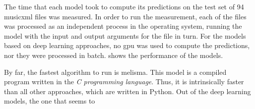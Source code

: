 
The time that each model took to compute its predictions on
the test set of 94 \gls{musicxml} files was measured. In
order to run the measurement, each of the files was
processed as an independent process in the operating system,
running the model with the input and output arguments for
the file in turn. For the models based on deep learning
approaches, no \gls{gpu} was used to compute the
predictions, nor they were processed in batch.
 shows the performance of the
models.


By far, the fastest algorithm to run is \gls{melisma}. This
model is a compiled program written in the \emph{C
programming language}. Thus, it is intrinsically faster than
all other approaches, which are written in Python. Out of
the deep learning models, the one that seems to 
